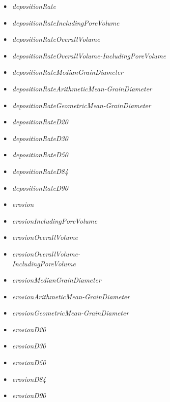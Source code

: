 \documentclass[11pt,a4paper]{article}
\begin{document}
\vspace{3ex}
\begin{multicols}{2}
\begin{itemize}
	\item \emph{depositionRate}
	\item \emph{depositionRateIncludingPoreVolume}
	\item \emph{depositionRateOverallVolume}
	\item \emph{depositionRateOverallVolume-}\emph{IncludingPoreVolume}
	\item \emph{depositionRateMedianGrainDiameter}
	\item \emph{depositionRateArithmeticMean-}\emph{GrainDiameter}
	\item \emph{depositionRateGeometricMean-}\emph{GrainDiameter}
	\item \emph{depositionRateD20}
	\item \emph{depositionRateD30}
	\item \emph{depositionRateD50}
	\item \emph{depositionRateD84}
	\item \emph{depositionRateD90}
\end{itemize}
\end{multicols}
\vspace{3ex}
\begin{multicols}{2}
\begin{itemize}
	\item \emph{erosion}
	\item \emph{erosionIncludingPoreVolume}
	\item \emph{erosionOverallVolume}
	\item \emph{erosionOverallVolume-}\\ \emph{IncludingPoreVolume}
	\item \emph{erosionMedianGrainDiameter}
	\item \emph{erosionArithmeticMean-}\emph{GrainDiameter}
	\item \emph{erosionGeometricMean-}\emph{GrainDiameter}
	\item \emph{erosionD20}
	\item \emph{erosionD30}
	\item \emph{erosionD50}
	\item \emph{erosionD84}
	\item \emph{erosionD90}
\end{itemize}
\end{multicols}
\vspace{3ex}
\end{document}
